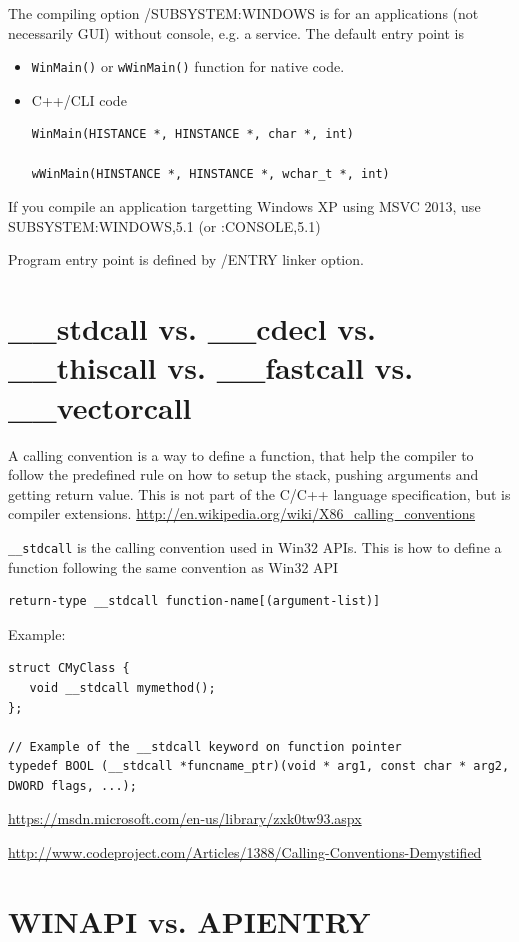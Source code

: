 The compiling option /SUBSYSTEM:WINDOWS is for an applications (not necessarily
GUI) without console, e.g. a service. The default entry point is 
\begin{itemize}
  \item \verb!WinMain()!
or \verb!wWinMain()! function for native code.
  \item C++/CLI code
\begin{verbatim}
WinMain(HISTANCE *, HINSTANCE *, char *, int) 

wWinMain(HINSTANCE *, HINSTANCE *, wchar_t *, int) 
\end{verbatim}
\end{itemize}

If you compile an application targetting Windows XP using MSVC 2013, 
use SUBSYSTEM:WINDOWS,5.1 (or :CONSOLE,5.1)

Program entry point is defined by /ENTRY linker option.

\section{\_\_stdcall vs. \_\_cdecl vs. \_\_thiscall vs. \_\_fastcall vs. \_\_vectorcall}

A calling convention is a way to define a function, that help the compiler to
follow the predefined rule on how to setup the stack, pushing arguments and
getting return value. This is not part of the C/C++ language specification, but is compiler extensions. 
\url{http://en.wikipedia.org/wiki/X86_calling_conventions}

\verb!__stdcall! is the calling convention used in Win32 APIs. This is how to
define a function following the same convention as Win32 API
\begin{verbatim}
return-type __stdcall function-name[(argument-list)]
\end{verbatim}
Example:
\begin{verbatim}
struct CMyClass {
   void __stdcall mymethod();
};

// Example of the __stdcall keyword on function pointer
typedef BOOL (__stdcall *funcname_ptr)(void * arg1, const char * arg2, DWORD flags, ...);
\end{verbatim}
\url{https://msdn.microsoft.com/en-us/library/zxk0tw93.aspx}

\url{http://www.codeproject.com/Articles/1388/Calling-Conventions-Demystified}

\section{WINAPI vs. APIENTRY}

